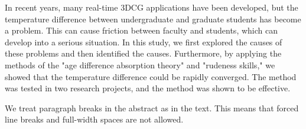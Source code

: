 In recent years, many real-time 3DCG applications have been developed,
but the temperature difference between undergraduate and graduate
students has become a problem. This can cause friction between faculty
and students, which can develop into a serious situation. In this
study, we first explored the causes of these problems and then
identified the causes. Furthermore, by applying the methods of the
"age difference absorption theory" and "rudeness skills," we showed
that the temperature difference could be rapidly converged. The method
was tested in two research projects, and the method was shown to be
effective.

We treat paragraph breaks in the abstract as in the text. This means
that forced line breaks and full-width spaces are not allowed.
